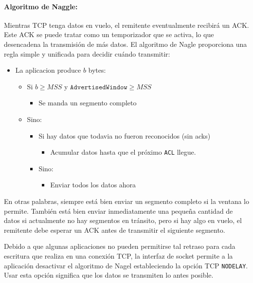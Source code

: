 \paragraph{Algoritmo de Naggle:} Mientras TCP tenga datos en vuelo, el remitente eventualmente recibirá un ACK. Este ACK se puede tratar como un temporizador que se activa, lo que desencadena la transmisión de más datos. El algoritmo de Nagle proporciona una regla simple y unificada para decidir cuándo transmitir:
\begin{itemize}
  \item[] La aplicacion produce \(b\) bytes:
  \begin{itemize}
    \item[] Si \(b \geq  MSS\) y \(\texttt{AdvertisedWindow}\geq MSS\)
     \begin{itemize}
      \item[] Se manda un segmento completo
    \end{itemize}
    \item[] Sino:
    \begin{itemize}
      \item[] Si hay datos que todavia no fueron reconocidos (sin acks)
      \begin{itemize}
        \item[] Acumular datos hasta que el próximo \texttt{ACL} llegue.
      \end{itemize}
      \item[] Sino:
      \begin{itemize}
        \item[] Enviar todos los datos ahora
      \end{itemize}
    \end{itemize}
  \end{itemize}
\end{itemize}

En otras palabras, siempre está bien enviar un segmento completo si la ventana lo permite. También está bien enviar inmediatamente una pequeña cantidad de datos si actualmente no hay segmentos en tránsito, pero si hay algo en vuelo, el remitente debe esperar un ACK antes de transmitir el siguiente segmento.

Debido a que algunas aplicaciones no pueden permitirse tal retraso para cada escritura que realiza en una conexión TCP, la interfaz de socket permite a la aplicación desactivar el algoritmo de Nagel estableciendo la opción TCP \texttt{NODELAY}. Usar esta opción significa que los datos se transmiten lo antes posible.

